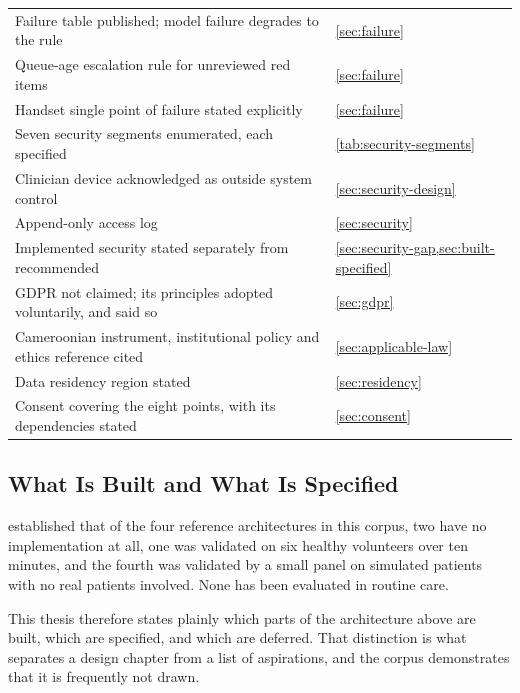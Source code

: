 \documentclass[12pt,a4paper,oneside]{report}
\begin{document}
\begin{table}[htbp]
\begin{tabularx}{\textwidth}{@{}X >{\raggedright\arraybackslash}p{5.0cm}@{}}
Failure table published; model failure degrades to the rule & \cref{sec:failure} \\
Queue-age escalation rule for unreviewed red items & \cref{sec:failure} \\
Handset single point of failure stated explicitly & \cref{sec:failure} \\
Seven security segments enumerated, each specified & \cref{tab:security-segments} \\
Clinician device acknowledged as outside system control & \cref{sec:security-design} \\
Append-only access log & \cref{sec:security} \\
Implemented security stated separately from recommended & \cref{sec:security-gap,sec:built-specified} \\
GDPR not claimed; its principles adopted voluntarily, and said so & \cref{sec:gdpr} \\
Cameroonian instrument, institutional policy and ethics reference cited & \cref{sec:applicable-law} \\
Data residency region stated & \cref{sec:residency} \\
Consent covering the eight points, with its dependencies stated & \cref{sec:consent} \\
\bottomrule
\end{tabularx}
\end{table}

\subsection{What Is Built and What Is Specified}\label{sec:built-specified}

 established that of the four reference architectures in this corpus, two have no implementation at all, one was validated on six healthy volunteers over ten minutes, and the fourth was validated by a small panel on simulated patients with no real patients involved. None has been evaluated in routine care.

This thesis therefore states plainly which parts of the architecture above are built, which are specified, and which are deferred. That distinction is what separates a design chapter from a list of aspirations, and the corpus demonstrates that it is frequently not drawn.
\end{document}
